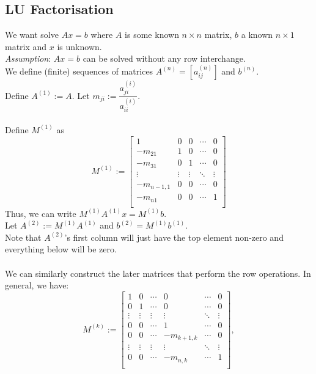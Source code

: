 \documentclass{article}
\begin{document}
\subsection{LU Factorisation}

	We want solve $Ax = b$ where $A$ is some known $n\times n$ matrix, $b$ a known $n\times1$ matrix and $x$ is unknown.\\
	\emph{Assumption}: $Ax = b$ can be solved without any row interchange.\\
	We define (finite) sequences of matrices $A^{(n)} = [a^{(n)}_{ij}]$ and $b^{(n)}.$ \\
	Define $A^{(1)} := A.$ Let $m_{ji} := \dfrac{a^{(i)}_{ji}}{a^{(i)}_{ii}}.$\\~\\
	Define $M^{(1)}$ as
	\[M^{(1)} := 
	\begin{bmatrix}
		1 & 0 & 0 & \cdots & 0\\
		-m_{21} & 1 & 0 & \cdots & 0\\
		-m_{31} & 0 & 1 & \cdots & 0\\
		\vdots & \vdots & \vdots & \ddots & \vdots\\
		-m_{n-1, 1} & 0 & 0 & \cdots & 0\\
		-m_{n1} & 0 & 0 & \cdots & 1\\
	\end{bmatrix}\]
	Thus, we can write $M^{(1)}A^{(1)}x = M^{(1)}b.$\\
	Let $A^{(2)} := M^{(1)}A^{(1)}$ and $b^{(2)} = M^{(1)}b^{(1)}.$\\
	Note that $A^{(2)}$'s first column will just have the top element non-zero and everything below will be zero.\\~\\
	We can similarly construct the later matrices that perform the row operations. In general, we have:
	\[M^{(k)} := 
	\begin{bmatrix}
		1 & 0 & \cdots & 0 & \cdots & 0\\
		0 & 1 & \cdots & 0 & \cdots & 0\\
		\vdots & \vdots & \vdots & \vdots & \ddots & \vdots\\
		0 & 0 & \cdots & 1 & \cdots & 0\\
		0 & 0 & \cdots & -m_{k+1, k} & \cdots & 0\\
		\vdots & \vdots & \vdots & \vdots & \ddots & \vdots\\
		0 & 0 & \cdots & -m_{n, k} & \cdots & 1\\
	\end{bmatrix},\]
\end{document}
